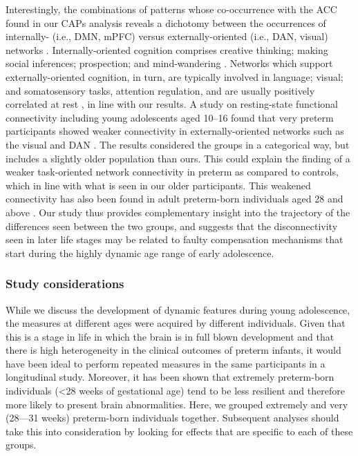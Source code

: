 Interestingly, the combinations of patterns whose co-occurrence with the ACC found in our CAPs analysis reveals a dichotomy between the occurrences of internally- (i.e., DMN, mPFC) versus externally-oriented (i.e., DAN, visual) networks \citep{Zabelina2016}. Internally-oriented cognition comprises creative thinking; making social inferences; prospection; and mind-wandering \citep{Zabelina2016, Buckner2019}. Networks which support externally-oriented cognition, in turn, are typically involved in language; visual; and somatosensory tasks, attention regulation, and are usually positively correlated at rest \citep{Lee2012}, in line with our results. A study on resting-state functional connectivity including young adolescents aged 10--16 found that very preterm participants showed weaker connectivity in externally-oriented networks such as the visual and DAN \citep{Wehrle2018}. The results considered the groups in a categorical way, but includes a slightly older population than ours. This could explain the finding of a weaker task-oriented network connectivity in preterm as compared to controls, which in line with what is seen in our older participants. This weakened connectivity has also been found in adult preterm-born individuals aged 28 and above \citep{White2014}. Our study thus provides complementary insight into the trajectory of the differences seen between the two groups, and suggests that the disconnectivity seen in later life stages may be related to faulty compensation mechanisms that start during the highly dynamic age range of early adolescence.

\subsubsection*{Study considerations}
While we discuss the development of dynamic features during young adolescence, the measures at different ages were acquired by different individuals. Given that this is a stage in life in which the brain is in full blown development and that there is high heterogeneity in the clinical outcomes of preterm infants, it would have been ideal to perform repeated measures in the same participants in a longitudinal study. Moreover, it has been shown that extremely preterm-born individuals (<28 weeks of gestational age) tend to be less resilient and therefore more likely to present brain abnormalities. Here, we grouped extremely and very (28---31 weeks) preterm-born individuals together. Subsequent analyses should take this into consideration by looking for effects that are specific to each of these groups.


